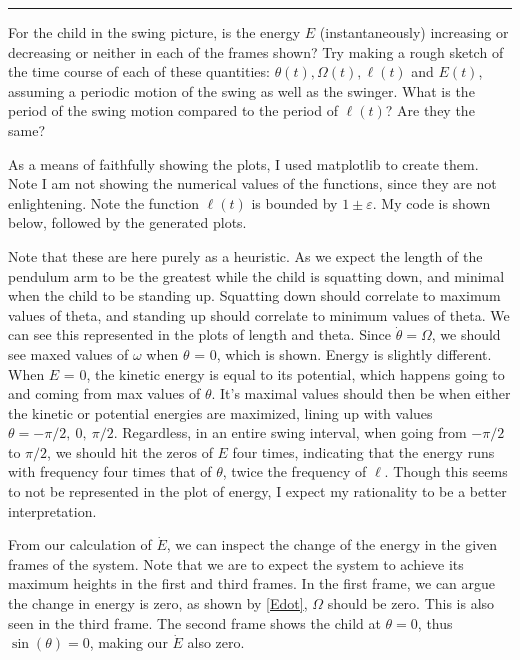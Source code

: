 \documentclass[12pt]{article}
\newcommand{\jump}{\vspace{5mm}}
\newcommand{\ep}{\varepsilon}
\begin{document}
\begin{enumerate}[]
        \hrule
        
        \jump
        For the child in the swing picture, is the energy $E$ (instantaneously) increasing or decreasing or neither in each of the frames shown? Try making a rough sketch of the time course of each of these quantities: $\theta(t), \Omega(t), \ell(t)$ and $E(t)$, assuming a periodic motion of the swing as well as the swinger. What is the period of the swing motion compared to the period of $\ell(t)$? Are they the same?

        \begin{solution}
            As a means of faithfully showing the plots, I used matplotlib to create them. Note I am not showing the numerical values of the functions, since they are not enlightening. Note the function $\ell(t)$ is bounded by $1 \pm \ep$. My code is shown below, followed by the generated plots.

            \jump

            Note that these are here purely as a heuristic. As we expect the length of the pendulum arm to be the greatest while the child is squatting down, and minimal when the child to be standing up. Squatting down should correlate to maximum values of theta, and standing up should correlate to minimum values of theta. We can see this represented in the plots of length and theta. Since $\dot{\theta} = \Omega$, we should see maxed values of $\omega$ when $\theta$ = 0, which is shown. Energy is slightly different. When $E$ = 0, the kinetic energy is equal to its potential, which happens going to and coming from max values of $\theta$. It's maximal values should then be when either the kinetic or potential energies are maximized, lining up with values $\theta = -\pi/2, \ 0, \ \pi/2$. Regardless, in an entire swing interval, when going from $-\pi/2$ to $\pi/2$, we should hit the zeros of $E$ four times, indicating that the energy runs with frequency four times that of $\theta$, twice the frequency of $\ell$. Though this seems to not be represented in the plot of energy, I expect my rationality to be a better interpretation. 

            From our calculation of $\dot{E}$, we can inspect the change of the energy in the given frames of the system. Note that we are to expect the system to achieve its maximum heights in the first and third frames. In the first frame, we can argue the change in energy is zero, as shown by \ref{Edot}, $\Omega$ should be zero. This is also seen in the third frame. The second frame shows the child at $\theta = 0$, thus $\sin(\theta) = 0$, making our $\dot{E}$ also zero. 
        \end{solution}
        \jump
        \begin{lstlisting}


\end{lstlisting}
\end{enumerate}
\end{document}
